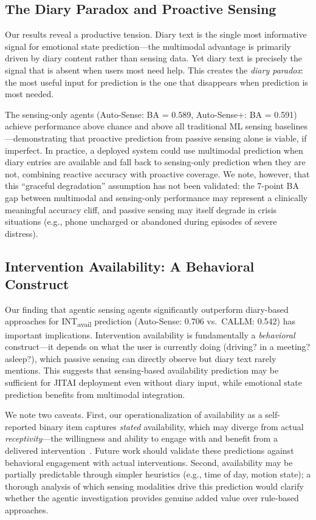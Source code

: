 \documentclass[screen,review,anonymous]{acmart}
\newcommand{\intavail}{INT\textsubscript{avail}}
\begin{document}
\subsection{The Diary Paradox and Proactive Sensing}

Our results reveal a productive tension. Diary text is the single most informative signal for emotional state prediction---the multimodal advantage is primarily driven by diary content rather than sensing data. Yet diary text is precisely the signal that is absent when users most need help. This creates the \emph{diary paradox}: the most useful input for prediction is the one that disappears when prediction is most needed.

The sensing-only agents (Auto-Sense: BA = 0.589, Auto-Sense+: BA = 0.591) achieve performance above chance and above all traditional ML sensing baselines---demonstrating that proactive prediction from passive sensing alone is viable, if imperfect. In practice, a deployed system could use multimodal prediction when diary entries are available and fall back to sensing-only prediction when they are not, combining reactive accuracy with proactive coverage. We note, however, that this ``graceful degradation'' assumption has not been validated: the 7-point BA gap between multimodal and sensing-only performance may represent a clinically meaningful accuracy cliff, and passive sensing may itself degrade in crisis situations (e.g., phone uncharged or abandoned during episodes of severe distress).

\subsection{Intervention Availability: A Behavioral Construct}

Our finding that agentic sensing agents significantly outperform diary-based approaches for \intavail{} prediction (Auto-Sense: 0.706 vs.\ CALLM: 0.542) has important implications. Intervention availability is fundamentally a \emph{behavioral} construct---it depends on what the user is currently doing (driving? in a meeting? asleep?), which passive sensing can directly observe but diary text rarely mentions. This suggests that sensing-based availability prediction may be sufficient for JITAI deployment even without diary input, while emotional state prediction benefits from multimodal integration.

We note two caveats. First, our operationalization of availability as a self-reported binary item captures \emph{stated} availability, which may diverge from actual \emph{receptivity}---the willingness and ability to engage with and benefit from a delivered intervention~\cite{mishra2021receptivity, kunzler2019receptivity}. Future work should validate these predictions against behavioral engagement with actual interventions. Second, availability may be partially predictable through simpler heuristics (e.g., time of day, motion state); a thorough analysis of which sensing modalities drive this prediction would clarify whether the agentic investigation provides genuine added value over rule-based approaches.
\end{document}
